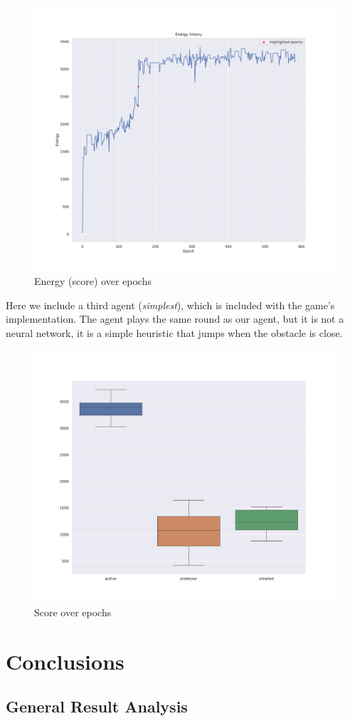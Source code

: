 \documentclass[review]{elsarticle}
\begin{document}
\begin{figure}[H]
    \centering
    \includegraphics[width=.7\linewidth]{energy_epoch.pdf}
    \caption{Energy (score) over epochs}
    \label{fig:energy}
\end{figure}

Here we include a third agent (\textit{simplest}), which is included with the game's implementation. The agent plays the same round as our agent, but it is not a neural network, it is a simple heuristic that jumps when the obstacle is close.

\begin{figure}[H]
    \centering
    \includegraphics[width=.7\linewidth]{agent_comparison.pdf}
    \caption{Score over epochs}
    \label{fig:score_comparison}
\end{figure}

\section{Conclusions}
\subsection{General Result Analysis}
\end{document}
